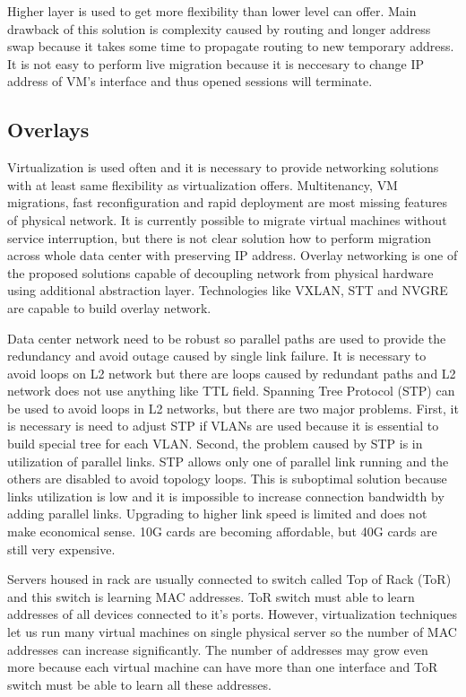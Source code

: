 Higher layer is used to get more flexibility than lower level can offer. Main drawback of this solution is complexity caused by routing and longer address swap because it takes some time to propagate routing to new temporary address. It is not easy to perform live migration because it is neccesary to change \Ac{IP} address of \Ac{VM}'s interface and thus opened sessions will terminate.

\subsection{Overlays}
\label{par:overlays}
Virtualization is used often and it is necessary to provide networking solutions with at least same flexibility as virtualization offers. Multitenancy, \Ac{VM} migrations, fast reconfiguration and rapid deployment are most missing features of physical network. It is currently possible to migrate virtual machines without service interruption, but there is not clear solution how to perform migration across whole data center with preserving \Ac{IP} address. Overlay networking is one of the proposed solutions capable of decoupling network from physical hardware using additional abstraction layer. 
Technologies like \Ac{VXLAN}, \Ac{STT} and \Ac{NVGRE} are capable to build overlay network. 

Data center network need to be robust so parallel paths are used to provide the redundancy and avoid outage caused by single link failure. It is necessary to avoid loops on L2 network but there are loops caused by redundant paths and L2 network does not use anything like \Ac{TTL} field.  Spanning Tree Protocol (\Ac{STP}) can be used to avoid loops in L2 networks, but there are two major problems. First, it is necessary  is need to adjust \Ac{STP} if \Ac{VLAN}s are used because it is essential to build special tree for each \Ac{VLAN}. Second, the problem caused by \Ac{STP} is in utilization of parallel links. \Ac{STP} allows only one of parallel link running and the others are disabled to avoid topology loops. This is suboptimal solution because links utilization is low and it is impossible to increase connection bandwidth by adding parallel links. Upgrading to higher link speed is limited and does not make economical sense. 10G cards are becoming affordable, but 40G cards are still very expensive.

Servers housed in rack are usually connected to switch called Top of Rack (\Ac{ToR}) and this switch is learning \Ac{MAC} addresses. 
\Ac{ToR} switch must able to learn addresses of all devices connected to it's ports. However, virtualization techniques let us run many virtual machines on single physical server so the number of \Ac{MAC} addresses can increase significantly. The number of addresses may grow even more because each virtual machine can have more than one interface and \Ac{ToR} switch must be able to learn all these addresses.

